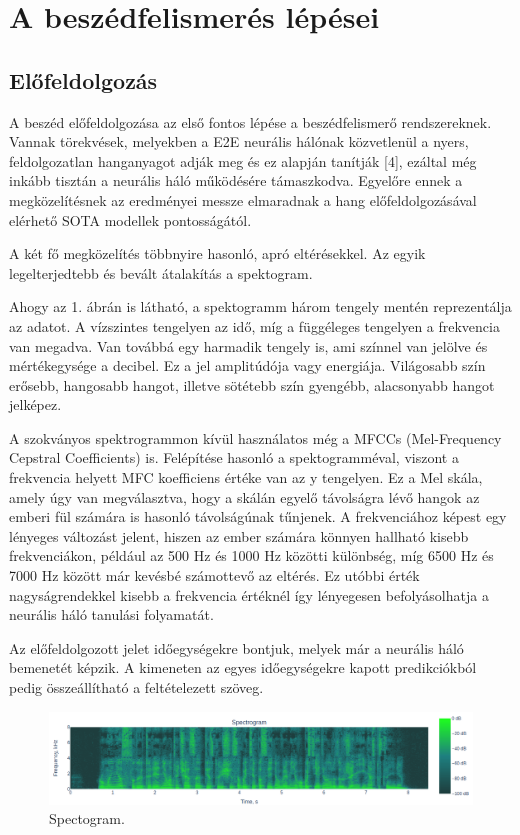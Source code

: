 \section{A beszédfelismerés lépései}

\subsection{Előfeldolgozás}

A beszéd előfeldolgozása az első fontos lépése a beszédfelismerő rendszereknek. Vannak törekvések, melyekben a E2E neurális hálónak közvetlenül a nyers, feldolgozatlan hanganyagot adják meg és ez alapján tanítják [4], ezáltal még inkább tisztán a neurális háló működésére támaszkodva. Egyelőre ennek a megközelítésnek az eredményei messze elmaradnak a hang előfeldolgozásával elérhető SOTA modellek pontosságától.

A két fő megközelítés többnyire hasonló, apró eltérésekkel. Az egyik legelterjedtebb és bevált átalakítás a spektogram.

Ahogy az 1. ábrán is látható, a spektogramm három tengely mentén reprezentálja az adatot. A vízszintes tengelyen az idő, míg a függéleges tengelyen a frekvencia van megadva. Van továbbá egy harmadik tengely is, ami színnel van jelölve és mértékegysége a decibel. Ez a jel amplitúdója vagy energiája. Világosabb szín erősebb, hangosabb hangot, illetve sötétebb szín gyengébb, alacsonyabb hangot jelképez.

A szokványos spektrogrammon kívül használatos még a MFCCs (Mel-Frequency Cepstral Coefficients) is. Felépítése hasonló a spektogramméval, viszont a frekvencia helyett MFC koefficiens \cite {mfcc} értéke van az y tengelyen. Ez a Mel skála, amely úgy van megválasztva, hogy a skálán egyelő távolságra lévő hangok az emberi fül számára is hasonló távolságúnak tűnjenek. A frekvenciához képest egy lényeges változást jelent, hiszen az ember számára könnyen hallható kisebb frekvenciákon, például az 500 Hz és 1000 Hz közötti különbség, míg 6500 Hz és 7000 Hz között már kevésbé számottevő az eltérés. Ez utóbbi érték nagyságrendekkel kisebb a frekvencia értéknél így lényegesen befolyásolhatja a neurális háló tanulási folyamatát.

Az előfeldolgozott jelet időegységekre bontjuk, melyek már a neurális háló bemenetét képzik. A kimeneten az egyes időegységekre kapott predikciókból pedig összeállítható a feltételezett szöveg.

\begin{figure}[!ht]
\centering
\includegraphics[width=150mm, keepaspectratio]{figures/spectogram.png}
\caption{Spectogram.}
\label{fig:TeXstudio}
\end{figure}

